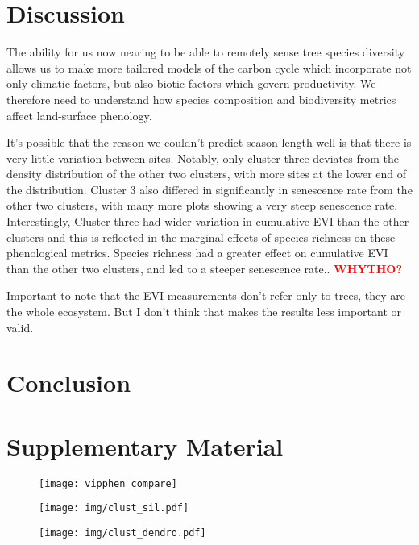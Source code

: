\documentclass[11pt,a4paper]{article}
\newcommand{\todo}[1]{\textcolor{red}{\textbf{#1}}}   %
\newcommand{\beginsupplement}{%
	\setcounter{table}{0}
	\renewcommand{\thetable}{S\arabic{table}}%
	\setcounter{figure}{0}
	\renewcommand{\thefigure}{S\arabic{figure}}%
	}
\begin{document}
\section{Discussion}

The ability for us now nearing to be able to remotely sense tree species diversity allows us to make more tailored models of the carbon cycle which incorporate not only climatic factors, but also biotic factors which govern productivity. We therefore need to understand how species composition and biodiversity metrics affect land-surface phenology. 

It's possible that the reason we couldn't predict season length well is that there is very little variation between sites. Notably, only cluster three deviates from the density distribution of the other two clusters, with more sites at the lower end of the distribution. Cluster 3 also differed in significantly in senescence rate from the other two clusters, with many more plots showing a very steep senescence rate. Interestingly, Cluster three had wider variation in cumulative EVI than the other clusters and this is reflected in the marginal effects of species richness on these phenological metrics. Species richness had a greater effect on cumulative EVI than the other two clusters, and led to a steeper senescence rate.. \todo{WHYTHO?}

Important to note that the EVI measurements don't refer only to trees, they are the whole ecosystem. But I don't think that makes the results less important or valid.

\section{Conclusion}

\printbibliography

\section{Supplementary Material}
\beginsupplement

\begin{figure}[H]
\centering
	\texttt{[image: vipphen\_compare]}
	\caption{}
	\label{vipphen_compare}
\end{figure}





\begin{figure}[H]
\centering
	\texttt{[image: img/clust\_sil.pdf]}
	\caption{}
	\label{clust_sil}
\end{figure}

\begin{figure}[H]
\centering
	\texttt{[image: img/clust\_dendro.pdf]}
	\caption{}
	\label{clust_dendro}
\end{figure}
\end{document}
